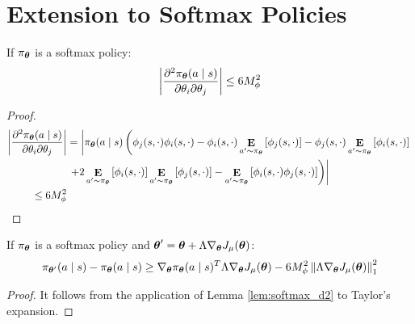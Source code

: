 \chapter{Extension to Softmax Policies}

\begin{lemma}\label{lem:softmax_d2}
If $\pi_{\vtheta}$ is a softmax policy:
\[
\left| \frac{\partial^2\pi_{\vtheta}(a \mid s)}
	{\partial\theta_i\partial\theta_j}\right| \leq
	6M_{\phi}^2
\]
\end{lemma}
\begin{proof}
\begin{align*}
\left|\frac{\partial^2\pi_{\vtheta}(a \mid s)}
		{\partial\theta_i\partial\theta_j}\right|
		&= \left| \pi_{\vtheta}(a\mid s)\left(
		\phi_j(s,\cdot)\phi_i(s,\cdot) -  \phi_i(s,\cdot)\expected{a'}{\vtheta}{\phi_j(s,\cdot)} - \phi_j(s,\cdot)\expected{a'}{\vtheta}{\phi_i(s,\cdot)}\right.\right. \\
		&\left.\left.+ 2\expected{a'}{\vtheta}{\phi_i(s,\cdot)}\expected{a'}{\vtheta}{\phi_j(s,\cdot)} - \expected{a'}{\vtheta}{\phi_i(s,\cdot)\phi_j(s,\cdot)}\right)\right| \\
		\leq 6M_\phi^2
\end{align*}
\end{proof}

\begin{lemma}\label{lem:softmax_diff}
If $\pi_{\vtheta}$ is a softmax policy and $\vtheta' = \vtheta+\Lambda\gradJ{\vtheta}$:
\[
\pi_{\vtheta'}(a \mid s) - \pi_{\vtheta}(a \mid s) \geq 
	\nabla_{\vtheta}\pi_{\vtheta}(a \mid s)^T\Lambda\gradJ{\vtheta} -
	6M_{\phi}^2\norm[1]{\Lambda\gradJ{\vtheta}}^2
\]
\end{lemma}
\begin{proof}
It follows from the application of Lemma \ref{lem:softmax_d2} to Taylor's expansion.
\end{proof}

